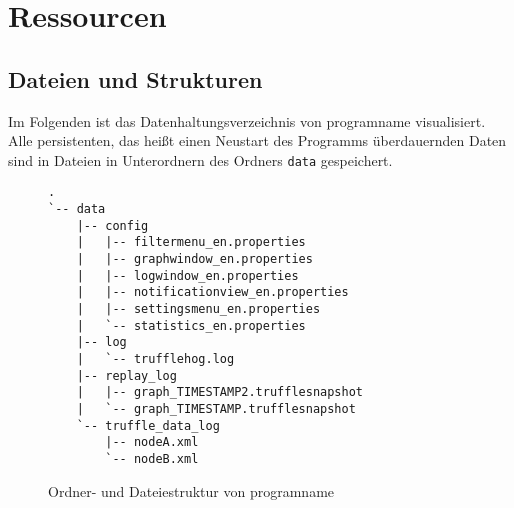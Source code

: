 \chapter{Ressourcen}
\section{Dateien und Strukturen}
Im Folgenden ist das Datenhaltungsverzeichnis von \gls{programname} visualisiert. Alle persistenten, das heißt einen Neustart des Programms überdauernden Daten sind in Dateien in Unterordnern des Ordners \texttt{data} gespeichert.  
\begin{figure}[H]
  \centering
\begin{verbatim}
.
`-- data
    |-- config
    |   |-- filtermenu_en.properties
    |   |-- graphwindow_en.properties
    |   |-- logwindow_en.properties
    |   |-- notificationview_en.properties
    |   |-- settingsmenu_en.properties
    |   `-- statistics_en.properties
    |-- log
    |   `-- trufflehog.log
    |-- replay_log
    |   |-- graph_TIMESTAMP2.trufflesnapshot
    |   `-- graph_TIMESTAMP.trufflesnapshot
    `-- truffle_data_log
        |-- nodeA.xml
        `-- nodeB.xml
\end{verbatim}
  \caption[Ordner- und Dateiestruktur von \gls{programname}]{Ordner- und Dateiestruktur von \gls{programname}}
\end{figure}

